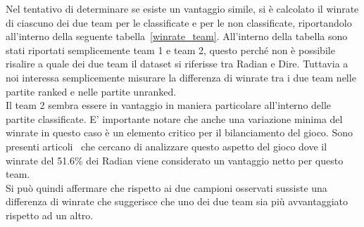 Nel tentativo di determinare se esiste un vantaggio simile, si è calcolato il winrate di ciascuno dei due team per le classificate e per le non classificate, riportandolo all'interno della seguente tabella~\ref{winrate_team}. All'interno della tabella sono stati riportati semplicemente team 1 e team 2, questo perché non è possibile risalire a quale dei due team il dataset si riferisse tra Radian e Dire. Tuttavia a noi interessa semplicemente misurare la differenza di winrate tra i due team nelle partite ranked e nelle partite unranked.\\
Il team 2 sembra essere in vantaggio in maniera particolare all'interno delle partite classificate. E' importante notare che anche una variazione minima del winrate in questo caso è un elemento critico per il bilanciamento del gioco. Sono presenti articoli~\cite{WinRateDota2} che cercano di analizzare questo aspetto del gioco dove il winrate del 51.6\% dei Radian viene considerato un vantaggio netto per questo team. \\
Si può quindi affermare che rispetto ai due campioni osservati sussiste una differenza di winrate che suggerisce che uno dei due team sia più avvantaggiato rispetto ad un altro.
